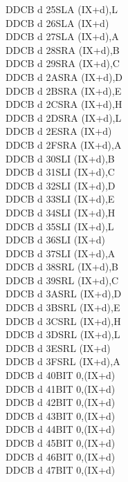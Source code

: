 \begin{multicols}{3}
{\begin{tabbing}
    DDCB d 25\>SLA (IX+d),L\UNDOC\\
    DDCB d 26\>SLA (IX+d)\\
    DDCB d 27\>SLA (IX+d),A\UNDOC\\
    DDCB d 28\>SRA (IX+d),B\UNDOC\\
    DDCB d 29\>SRA (IX+d),C\UNDOC\\
    DDCB d 2A\>SRA (IX+d),D\UNDOC\\
    DDCB d 2B\>SRA (IX+d),E\UNDOC\\
    DDCB d 2C\>SRA (IX+d),H\UNDOC\\
    DDCB d 2D\>SRA (IX+d),L\UNDOC\\
    DDCB d 2E\>SRA (IX+d)\\
    DDCB d 2F\>SRA (IX+d),A\UNDOC\\
    DDCB d 30\>SLI (IX+d),B\UNDOC\\
    DDCB d 31\>SLI (IX+d),C\UNDOC\\
    DDCB d 32\>SLI (IX+d),D\UNDOC\\
    DDCB d 33\>SLI (IX+d),E\UNDOC\\
    DDCB d 34\>SLI (IX+d),H\UNDOC\\
    DDCB d 35\>SLI (IX+d),L\UNDOC\\
    DDCB d 36\>SLI (IX+d)\UNDOC\\
    DDCB d 37\>SLI (IX+d),A\UNDOC\\
    DDCB d 38\>SRL (IX+d),B\UNDOC\\
    DDCB d 39\>SRL (IX+d),C\UNDOC\\
    DDCB d 3A\>SRL (IX+d),D\UNDOC\\
    DDCB d 3B\>SRL (IX+d),E\UNDOC\\
    DDCB d 3C\>SRL (IX+d),H\UNDOC\\
    DDCB d 3D\>SRL (IX+d),L\UNDOC\\
    DDCB d 3E\>SRL (IX+d)\\
    DDCB d 3F\>SRL (IX+d),A\UNDOC\\
    DDCB d 40\>BIT 0,(IX+d)\UNDOC\\
    DDCB d 41\>BIT 0,(IX+d)\UNDOC\\
    DDCB d 42\>BIT 0,(IX+d)\UNDOC\\
    DDCB d 43\>BIT 0,(IX+d)\UNDOC\\
    DDCB d 44\>BIT 0,(IX+d)\UNDOC\\
    DDCB d 45\>BIT 0,(IX+d)\UNDOC\\
    DDCB d 46\>BIT 0,(IX+d)\\
    DDCB d 47\>BIT 0,(IX+d)\UNDOC\\

\end{tabbing}}
\end{multicols}
